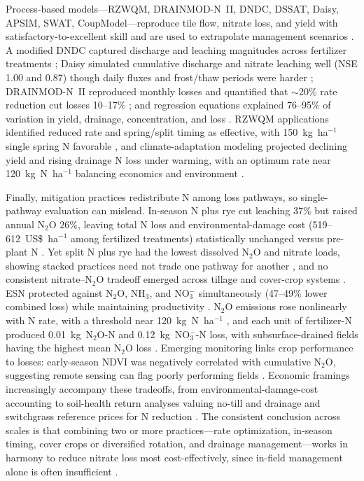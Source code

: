 \documentclass[11pt]{article}
\begin{document}
Process-based models---RZWQM, DRAINMOD-N~II, DNDC, DSSAT, Daisy, APSIM, SWAT, CoupModel---reproduce tile flow, nitrate loss, and yield with satisfactory-to-excellent skill and are used to extrapolate management scenarios \parencite{Jeong2018,Ahmed2007b,Ale2012b,Pasley2021,Motarjemi2021,Conrad2009}. A modified DNDC captured discharge and leaching magnitudes across fertilizer treatments \parencite{Li2006}; Daisy simulated cumulative discharge and nitrate leaching well (NSE 1.00 and 0.87) though daily fluxes and frost/thaw periods were harder \parencite{Motarjemi2021}; DRAINMOD-N~II reproduced monthly losses and quantified that $\sim$20\% rate reduction cut losses 10--17\% \parencite{Ale2012b}; and regression equations explained 76--95\% of variation in yield, drainage, concentration, and loss \parencite{Malone2007}. RZWQM applications identified reduced rate and spring/split timing as effective, with 150~kg~ha$^{-1}$ single spring N favorable \parencite{Azevedo1997,Malone2007b}, and climate-adaptation modeling projected declining yield and rising drainage N loss under warming, with an optimum rate near 120~kg~N~ha$^{-1}$ balancing economics and environment \parencite{Wang2016b}.

Finally, mitigation practices redistribute N among loss pathways, so single-pathway evaluation can mislead. In-season N plus rye cut leaching 37\% but raised annual N$_2$O 26\%, leaving total N loss and environmental-damage cost (519--612~US\$~ha$^{-1}$ among fertilized treatments) statistically unchanged versus pre-plant N \parencite{PrezaFontes2023}. Yet split N plus rye had the lowest dissolved N$_2$O and nitrate loads, showing stacked practices need not trade one pathway for another \parencite{Oliveira2025}, and no consistent nitrate--N$_2$O tradeoff emerged across tillage and cover-crop systems \parencite{OBrien2022}. ESN protected against N$_2$O, NH$_3$, and NO$_3^-$ simultaneously (47--49\% lower combined loss) while maintaining productivity \parencite{Menegaz2025}. N$_2$O emissions rose nonlinearly with N rate, with a threshold near 120~kg~N~ha$^{-1}$ \parencite{Wang2016b}, and each unit of fertilizer-N produced 0.01~kg~N$_2$O-N and 0.12~kg~NO$_3^-$-N loss, with subsurface-drained fields having the highest mean N$_2$O loss \parencite{Chatterjee2020b}. Emerging monitoring links crop performance to losses: early-season NDVI was negatively correlated with cumulative N$_2$O, suggesting remote sensing can flag poorly performing fields \parencite{Fontes2019}. Economic framings increasingly accompany these tradeoffs, from environmental-damage-cost accounting \parencite{PrezaFontes2023} to soil-health return analyses valuing no-till and drainage \parencite{Cassman2025} and switchgrass reference prices for N reduction \parencite{Woodbury2018}. The consistent conclusion across scales is that combining two or more practices---rate optimization, in-season timing, cover crops or diversified rotation, and drainage management---works in harmony to reduce nitrate loss most cost-effectively, since in-field management alone is often insufficient \parencite{Dinnes2002,Singh2023}.

\printbibliography
\end{document}
